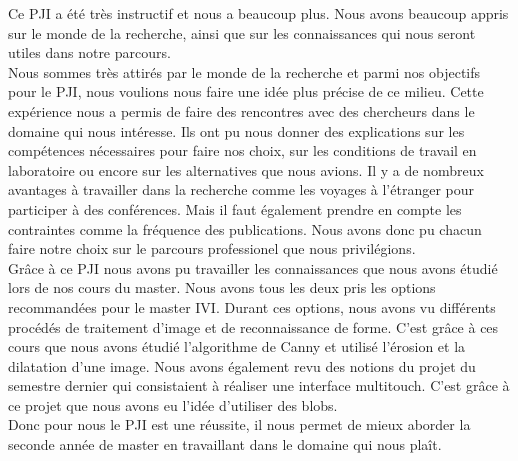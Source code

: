 Ce PJI a été très instructif et nous a beaucoup plus. Nous avons beaucoup appris sur le monde 
de la recherche, ainsi que sur les connaissances qui nous seront utiles dans notre parcours.\\

Nous sommes très attirés par le monde de la recherche et parmi nos objectifs pour le PJI, nous voulions 
nous faire une idée plus précise de ce milieu. Cette expérience nous a permis de faire des rencontres
avec des chercheurs dans le domaine qui nous intéresse. Ils ont pu nous donner des explications
sur les compétences nécessaires pour faire nos choix, sur les conditions de travail en laboratoire 
ou encore sur les alternatives que nous avions. Il y a de nombreux avantages à travailler dans la recherche
comme les voyages à l'étranger pour participer à des conférences. Mais il faut également prendre en compte les contraintes
comme la fréquence des publications. Nous avons donc pu chacun faire notre choix sur le parcours professionel
que nous privilégions.\\

Grâce à ce PJI nous avons pu travailler les connaissances que nous avons étudié lors de nos cours du master.
Nous avons tous les deux pris les options recommandées pour le master IVI. Durant ces options, nous avons 
vu différents procédés de traitement d'image et de reconnaissance de forme. C'est grâce à ces cours que nous
avons étudié l'algorithme de Canny et utilisé l'érosion et la dilatation d'une image. Nous avons également
revu des notions du projet du semestre dernier qui consistaient à réaliser une interface multitouch. C'est grâce
à ce projet que nous avons eu l'idée d'utiliser des blobs.\\

Donc pour nous le PJI est une réussite, il nous permet de mieux aborder la seconde année de master en travaillant 
dans le domaine qui nous plaît.
\newpage